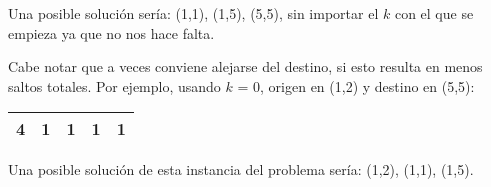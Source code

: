 Una posible solución sería: (1,1), (1,5), (5,5), sin importar el $k$ con el que se empieza ya que no nos hace falta.

Cabe notar que a veces conviene alejarse del destino, si esto resulta en menos saltos totales. Por ejemplo, usando $k$ = 0, origen en (1,2) y destino en (5,5):
\begin{center}
\begin{tabular}{|c|c|c|c|c|}
\hline
 4 & 1 & 1 & 1 & 1 \\
 \hline
\end{tabular}
\end{center}

Una posible solución de esta instancia del problema sería: (1,2), (1,1), (1,5).